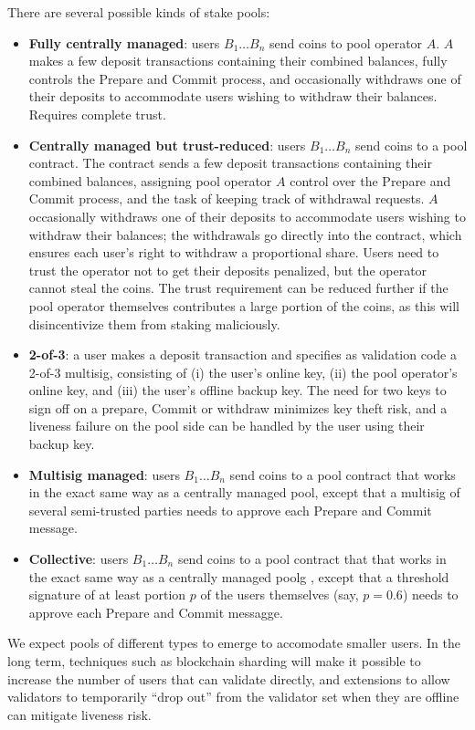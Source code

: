 \documentclass[12pt, final]{article}
\begin{document}
There are several possible kinds of stake pools:

\begin{itemize}
\item \textbf{Fully centrally managed}: users $B_1 \ldots B_n$ send coins to pool operator $A$. $A$ makes a few deposit transactions containing their combined balances, fully controls the Prepare and Commit process, and occasionally withdraws one of their deposits to accommodate users wishing to withdraw their balances. Requires complete trust.
\item \textbf{Centrally managed but trust-reduced}: users $B_1 \ldots B_n$ send coins to a pool contract. The contract sends a few deposit transactions containing their combined balances, assigning pool operator $A$ control over the Prepare and Commit process, and the task of keeping track of withdrawal requests. $A$ occasionally withdraws one of their deposits to accommodate users wishing to withdraw their balances; the withdrawals go directly into the contract, which ensures each user's right to withdraw a proportional share. Users need to trust the operator not to get their deposits penalized, but the operator cannot steal the coins. The trust requirement can be reduced further if the pool operator themselves contributes a large portion of the coins, as this will disincentivize them from staking maliciously.
\item \textbf{2-of-3}: a user makes a deposit transaction and specifies as validation code a 2-of-3 multisig, consisting of (i) the user's online key, (ii) the pool operator's online key, and (iii) the user's offline backup key. The need for two keys to sign off on a prepare, Commit or withdraw minimizes key theft risk, and a liveness failure on the pool side can be handled by the user using their backup key.
\item \textbf{Multisig managed}: users $B_1 \ldots B_n$ send coins to a pool contract that works in the exact same way as a centrally managed pool, except that a multisig of several semi-trusted parties needs to approve each Prepare and Commit message.
\item \textbf{Collective}: users $B_1 \ldots B_n$ send coins to a pool contract that that works in the exact same way as a centrally managed poolg
, except that a threshold signature of at least portion $p$ of the users themselves (say, $p = 0.6$) needs to approve each Prepare and Commit messagge.
\end{itemize}

We expect pools of different types to emerge to accomodate smaller users. In the long term, techniques such as blockchain sharding will make it possible to increase the number of users that can validate directly, and extensions to allow validators to temporarily ``drop out'' from the validator set when they are offline can mitigate liveness risk.
\end{document}
